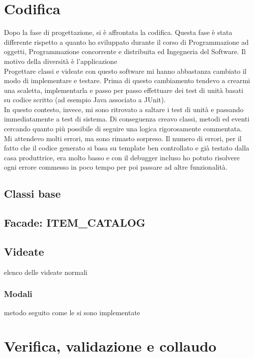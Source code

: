 \section{Codifica}
Dopo la fase di progettazione, si è affrontata la codifica. Questa fase è stata differente rispetto a quanto ho sviluppato durante il corso di Programmazione ad oggetti, Programmazione concorrente e distribuita ed Ingegneria del Software. Il motivo della diversità è l'applicazione \inde\.\\
Progettare classi e videate con questo software mi hanno abbastanza cambiato il modo di implementare e testare. Prima di questo cambiamento tendevo a crearmi una scaletta, implementarla e passo per passo effettuare dei test di unità basati su codice scritto (ad esempio Java associato a JUnit).\\
In questo contesto, invece, mi sono ritrovato a saltare i test di unità e passando immediatamente a test di sistema. Di conseguenza creavo classi, metodi ed eventi cercando quanto più possibile di seguire una logica rigorosamente commentata. Mi attendevo molti errori, ma sono rimasto sorpreso. Il numero di errori, per il fatto che il codice generato si basa su template ben controllato e già testato dalla casa produttrice, era molto basso e con il debugger incluso ho potuto risolvere ogni errore commesso in poco tempo per poi passare ad altre funzionalità.

\subsection{Classi base}


\subsection{Facade: ITEM\_CATALOG}

\subsection{Videate}
elenco delle videate normali

\subsubsection{Modali}
metodo seguito come le si sono implementate

\section{Verifica, validazione e collaudo}

